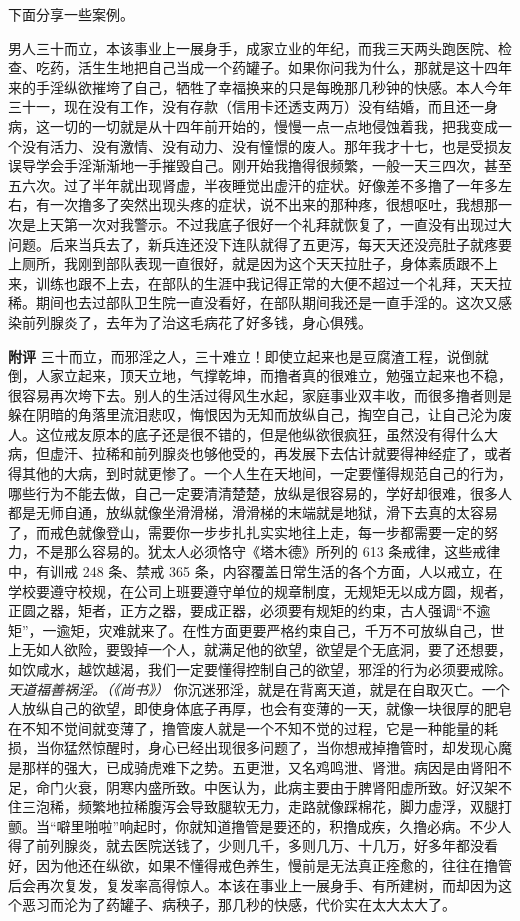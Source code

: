下面分享一些案例。

\begin{case}
    男人三十而立，本该事业上一展身手，成家立业的年纪，而我三天两头跑医院、检查、吃药，活生生地把自己当成一个药罐子。如果你问我为什么，那就是这十四年来的手淫纵欲摧垮了自己，牺牲了幸福换来的只是每晚那几秒钟的快感。本人今年三十一，现在没有工作，没有存款（信用卡还透支两万）没有结婚，而且还一身病，这一切的一切就是从十四年前开始的，慢慢一点一点地侵蚀着我，把我变成一个没有活力、没有激情、没有动力、没有憧憬的废人。那年我才十七，也是受损友误导学会手淫渐渐地一手摧毁自己。刚开始我撸得很频繁，一般一天三四次，甚至五六次。过了半年就出现肾虚，半夜睡觉出虚汗的症状。好像差不多撸了一年多左右，有一次撸多了突然出现头疼的症状，说不出来的那种疼，很想呕吐，我想那一次是上天第一次对我警示。不过我底子很好一个礼拜就恢复了，一直没有出现过大问题。后来当兵去了，新兵连还没下连队就得了五更泻，每天天还没亮肚子就疼要上厕所，我刚到部队表现一直很好，就是因为这个天天拉肚子，身体素质跟不上来，训练也跟不上去，在部队的生涯中我记得正常的大便不超过一个礼拜，天天拉稀。期间也去过部队卫生院一直没看好，在部队期间我还是一直手淫的。这次又感染前列腺炎了，去年为了治这毛病花了好多钱，身心俱残。

    \textbf{附评} 三十而立，而邪淫之人，三十难立！即使立起来也是豆腐渣工程，说倒就倒，人家立起来，顶天立地，气撑乾坤，而撸者真的很难立，勉强立起来也不稳，很容易再次垮下去。别人的生活过得风生水起，家庭事业双丰收，而很多撸者则是躲在阴暗的角落里流泪悲叹，悔恨因为无知而放纵自己，掏空自己，让自己沦为废人。这位戒友原本的底子还是很不错的，但是他纵欲很疯狂，虽然没有得什么大病，但虚汗、拉稀和前列腺炎也够他受的，再发展下去估计就要得神经症了，或者得其他的大病，到时就更惨了。一个人生在天地间，一定要懂得规范自己的行为，哪些行为不能去做，自己一定要清清楚楚，放纵是很容易的，学好却很难，很多人都是无师自通，放纵就像坐滑滑梯，滑滑梯的末端就是地狱，滑下去真的太容易了，而戒色就像登山，需要你一步步扎扎实实地往上走，每一步都需要一定的努力，不是那么容易的。犹太人必须恪守《塔木德》所列的 613 条戒律，这些戒律中，有训戒 248 条、禁戒 365 条，内容覆盖日常生活的各个方面，人以戒立，在学校要遵守校规，在公司上班要遵守单位的规章制度，无规矩无以成方圆，规者，正圆之器，矩者，正方之器，要成正器，必须要有规矩的约束，古人强调“不逾矩”，一逾矩，灾难就来了。在性方面更要严格约束自己，千万不可放纵自己，世上无如人欲险，要毁掉一个人，就满足他的欲望，欲望是个无底洞，要了还想要，如饮咸水，越饮越渴，我们一定要懂得控制自己的欲望，邪淫的行为必须要戒除。\textit{天道福善祸淫。（《尚书》）} 你沉迷邪淫，就是在背离天道，就是在自取灭亡。一个人放纵自己的欲望，即使身体底子再厚，也会有变薄的一天，就像一块很厚的肥皂在不知不觉间就变薄了，撸管废人就是一个不知不觉的过程，它是一种能量的耗损，当你猛然惊醒时，身心已经出现很多问题了，当你想戒掉撸管时，却发现心魔是那样的强大，已成骑虎难下之势。五更泄，又名鸡鸣泄、肾泄。病因是由肾阳不足，命门火衰，阴寒内盛所致。中医认为，此病主要由于脾肾阳虚所致。好汉架不住三泡稀，频繁地拉稀腹泻会导致腿软无力，走路就像踩棉花，脚力虚浮，双腿打颤。当“噼里啪啦”响起时，你就知道撸管是要还的，积撸成疾，久撸必病。不少人得了前列腺炎，就去医院送钱了，少则几千，多则几万、十几万，好多年都没看好，因为他还在纵欲，如果不懂得戒色养生，慢前是无法真正痊愈的，往往在撸管后会再次复发，复发率高得惊人。本该在事业上一展身手、有所建树，而却因为这个恶习而沦为了药罐子、病秧子，那几秒的快感，代价实在太大太大了。
\end{case}

